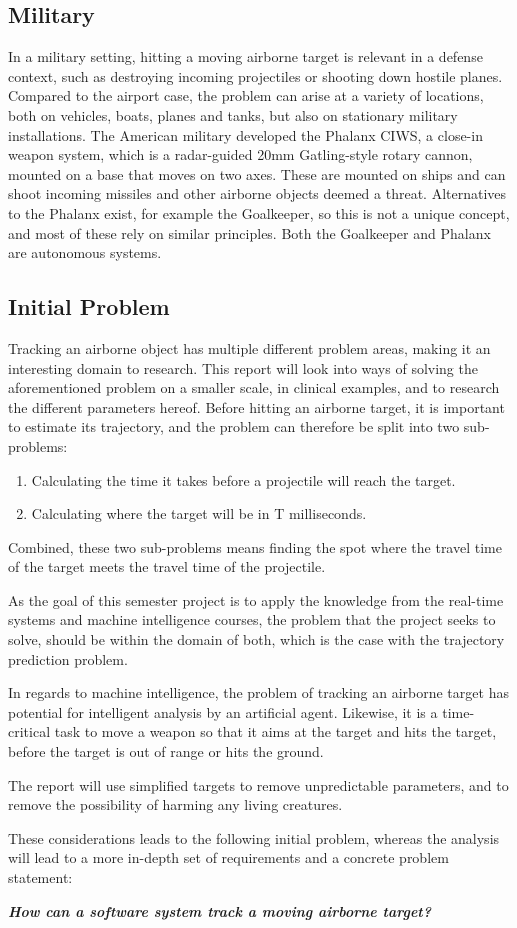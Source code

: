 \subsection{Military}
In a military setting, hitting a moving airborne target is relevant in a defense context, such as destroying incoming projectiles or shooting down hostile planes.
Compared to the airport case, the problem can arise at a variety of locations, both on vehicles, boats, planes and tanks, but also on stationary military installations.
The American military developed the Phalanx CIWS, a close-in weapon system, which is a radar-guided 20mm Gatling-style rotary cannon, mounted on a base that moves on two axes.
These are mounted on ships and can shoot incoming missiles and other airborne objects deemed a threat.
Alternatives to the Phalanx exist, for example the Goalkeeper, so this is not a unique concept, and most of these rely on similar principles.
Both the Goalkeeper and Phalanx are autonomous systems.

\subsection{Initial Problem}
Tracking an airborne object has multiple different problem areas, making it an interesting domain to research.
This report will look into ways of solving the aforementioned problem on a smaller scale, in clinical examples, and to research the different parameters hereof.
Before hitting an airborne target, it is important to estimate its trajectory, and the problem can therefore be split into two sub-problems:
\begin{enumerate}
  \item Calculating the time it takes before a projectile will reach the target.
  \item Calculating where the target will be in T milliseconds.
\end{enumerate}
Combined, these two sub-problems means finding the spot where the travel time of the target meets the travel time of the projectile.

As the goal of this semester project is to apply the knowledge from the real-time systems and machine intelligence courses, the problem that the project seeks to solve, should be within the domain of both, which is the case with the trajectory prediction problem.

In regards to machine intelligence, the problem of tracking an airborne target has potential for intelligent analysis by an artificial agent.
Likewise, it is a time-critical task to move a weapon so that it aims at the target and hits the target, before the target is out of range or hits the ground.

The report will use simplified targets to remove unpredictable parameters, and to remove the possibility of harming any living creatures.

These considerations leads to the following initial problem, whereas the analysis will lead to a more in-depth set of requirements and a concrete problem statement:
\label{key:initialProblem}

\begin{center}
  \textit{\textbf{How can a software system track a moving airborne target?}}
\end{center}
